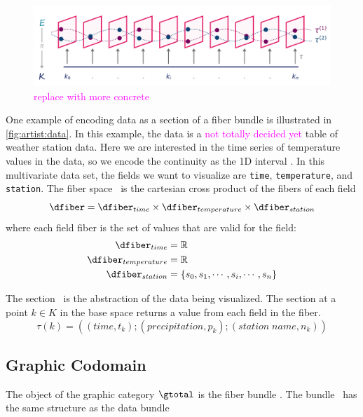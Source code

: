 \documentclass[10pt,journal,compsoc]{IEEEtran}
\newcommand{\note}[1]{\textcolor{magenta}{#1}}
\theoremstyle{definition}
\theoremstyle{remark}
\begin{document}
\begin{figure}[h!]
  \includegraphics[width=\columnwidth]{fiberbundle.png}
  \caption{\note{replace with more concrete}}
  \label{fig:artist:data}
\end{figure}

One example of encoding data as a section of a fiber bundle is illustrated in \autoref{fig:artist:data}. In this example, the data is a \note{not totally decided yet} table of weather station data. Here we are interested in the time series of temperature values in the data, so we encode the continuity as the 1D interval \dbase. In this multivariate data set, the fields we want to visualize are \texttt{time}, \texttt{temperature}, and \texttt{station}. The fiber space \dfiber\ is the cartesian cross product of the fibers of each field
\begin{equation*}
  \dfiber = \dfiber_{time} \times \dfiber_{temperature} \times \dfiber_{station}
\end{equation*}
where each field fiber is the set of values that are valid for the field: 
\begin{align*}
  \dfiber_{time} &= \mathbb{R} \\
  \dfiber_{temperature} &= \mathbb{R}\\
  \dfiber_{station} &= \{s_0, s_1, \cdots, s_i, \cdots, s_n\} 
\end{align*}

The section \dsection\ is the abstraction of the data being visualized. The section at a point $k \in K$ in the base space returns a value from each field in the fiber.
\begin{equation*}
  \tau(k) = ((time, t_k); (precipitation, p_k); (station\;name, n_k))
\end{equation*}


\subsection{Graphic Codomain} 
The object of the graphic category $\mathcal{\gtotal}$ is the fiber bundle \gtotal. The bundle \gtotal\ has the same structure as the data bundle \dtotal
\end{document}
